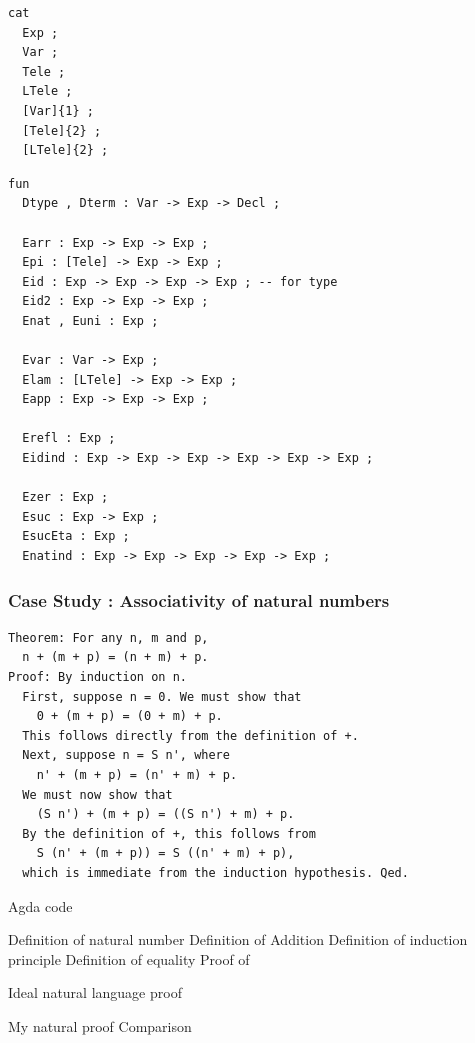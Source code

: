 \documentclass[10pt]{beamer}
\begin{document}
\begin{frame}[fragile]
\begin{verbatim}
cat
  Exp ;
  Var ;
  Tele ;
  LTele ;
  [Var]{1} ;
  [Tele]{2} ;
  [LTele]{2} ;
\end{verbatim}
\end{frame}

\begin{frame}[fragile]

\begin{verbatim}
fun
  Dtype , Dterm : Var -> Exp -> Decl ;

  Earr : Exp -> Exp -> Exp ;
  Epi : [Tele] -> Exp -> Exp ;
  Eid : Exp -> Exp -> Exp -> Exp ; -- for type
  Eid2 : Exp -> Exp -> Exp ;
  Enat , Euni : Exp ;

  Evar : Var -> Exp ;
  Elam : [LTele] -> Exp -> Exp ;
  Eapp : Exp -> Exp -> Exp ;

  Erefl : Exp ;
  Eidind : Exp -> Exp -> Exp -> Exp -> Exp -> Exp ;

  Ezer : Exp ;
  Esuc : Exp -> Exp ;
  EsucEta : Exp ; 
  Enatind : Exp -> Exp -> Exp -> Exp -> Exp ;
\end{verbatim}
\end{frame}



\begin{frame}[fragile]
\frametitle{Case Study : Associativity of natural numbers}
\begin{verbatim}
Theorem: For any n, m and p,
  n + (m + p) = (n + m) + p.
Proof: By induction on n.
  First, suppose n = 0. We must show that
    0 + (m + p) = (0 + m) + p.
  This follows directly from the definition of +.
  Next, suppose n = S n', where
    n' + (m + p) = (n' + m) + p.
  We must now show that
    (S n') + (m + p) = ((S n') + m) + p.
  By the definition of +, this follows from
    S (n' + (m + p)) = S ((n' + m) + p),
  which is immediate from the induction hypothesis. Qed.
\end{verbatim}
\end{frame}

\begin{frame}

Agda code

Definition of natural number
Definition of Addition
Definition of induction principle 
Definition of equality
Proof of 

Ideal natural language proof

My natural proof
Comparison



\end{frame}
\end{document}

